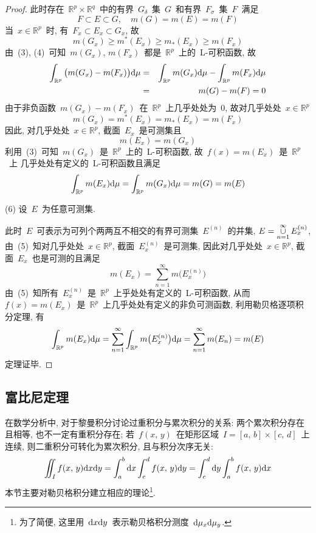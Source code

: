\begin{proof}
此时存在~$\mathbb{R}^p\times \mathbb{R}^q$~中的有界~$G_{\delta}$~集~$G$~和有界~$F_\sigma$~集~$F$~满足
\[
F \subset E \subset G, \quad m(G)=m(E)=m(F)
\]
当~$x \in \mathbb{R}^{p}$~时, 有~$F_{x}\subset E_{x} \subset G_{x}$, 故
\[
m(G_{x}) \geqslant m^{*}(E_{x}) \geqslant m_{*}(E_{x}) \geqslant  m(F_{x})
\]
由~(3), (4)~可知~$m(G_{x}),\,  m(F_{x})$~都是~$\mathbb{R}^{p}$~上的~L-可积函数, 故
\begin{eqnarray*}
\int_{\mathbb{R}^{p}}\big(m(G_{x})-m(F_{x})\big) \mathrm{d} \mu &=& \int_{\mathbb{R}^{p}}m (G_{x}) \mathrm{d} \mu - \int_{\mathbb{R}^{p}}m(F_{x}) \mathrm{d} \mu\\
&=&m(G)-m(F)=0
\end{eqnarray*}
由于非负函数~$m(G_{x})-m(F_{x})$~在~$\mathbb{R}^{p}$~上几乎处处为~$0$, 故对几乎处处~$x\in \mathbb{R}^{p}$
\[
m(G_{x})=m^{*}(E_{x})=m_{*}(E_{x})= m(F_{x})
\]
因此, 对几乎处处~$x \in \mathbb{R}^{p}$, 截面~$E_{x}$~是可测集且
\[
m(E_{x})=m(G_{x})
\]
利用~(3)~可知~$m(G_{x})$~是~$\mathbb{R}^{p}$~上的~L-可积函数, 故~$f(x)=m(E_{x})$~是~$\mathbb{R}^{p}$~上
几乎处处有定义的~L-可积函数且满足
\[
\int_{\mathbb{R}^{p}}m(E_{x}) \mathrm{d} \mu =\int_{\mathbb{R}^{p}}m(G_{x}) \mathrm{d} \mu = m(G)=m(E)
\]

(6) 设~$E$~为任意可测集.

此时~$E$~可表示为可列个两两互不相交的有界可测集~$E^{(n)}$~的并集,
$E=\mathop{\mathop{\cup}}\limits_{n=1}^{\infty} E^{(n)}_x$, 由~(5)~知对几乎处处~$x\in \mathbb{R}^{p}$,  截面~$E^{(n)}_x$~是可测集, 因此对几乎处处~$x \in \mathbb{R}^{p}$, 截面~$E_{x}$~也是可测的且满足
\[
m(E_{x})=\sum_{n=1}^{\infty}m\big(E^{(n)}_x\big)
\]
由~(5)~知所有~$E^{(n)}_x$~是~$\mathbb{R}^{p}$~上乎处处有定义的~L-可积函数,
从而~$f(x)=m(E_{x})$~是~$\mathbb{R}^{p}$~上几乎处处有定义的非负可测函数,
利用勒贝格逐项积分定理, 有
\[
\int_{\mathbb{R}^{p}}m(E_{x}) \mathrm{d} \mu = \sum_{n=1}^{\infty}\int_{\mathbb{R}^{p}} m\big(E^{(n)}_x\big)\mathrm{d} \mu =\sum_{n=1}^{\infty}m(E_{n}) = m(E)
\]
定理证毕.
\end{proof}

\subsection{富比尼定理}

在数学分析中, 对于黎曼积分讨论过重积分与累次积分的关系: 两个累次积分存在且相等, 也不一定有重积分存在; 若~$f(x,\, y)$~在矩形区域~$I=[a,\,  b]\times[c,\, d]$~上连续, 则二重积分可转化为累次积分, 且与积分次序无关:
\[
\iint_{I}f(x,\, y)\mathrm{d} x \mathrm{d} y=\int_{a}^{b}\mathrm{d} x \int_{c}^{d}f(x,\, y)\mathrm{d} y=\int_{c}^{d}\mathrm{d} y \int_{a}^{b}f(x,\, y)\mathrm{d} x
\]
本节主要对勒贝格积分建立相应的理论\footnote{为了简便, 这里用~$\mathrm{d} x \mathrm{d} y$~表示勒贝格积分测度~$\mathrm{d} \mu_x \mathrm{d} \mu_y$.}.

